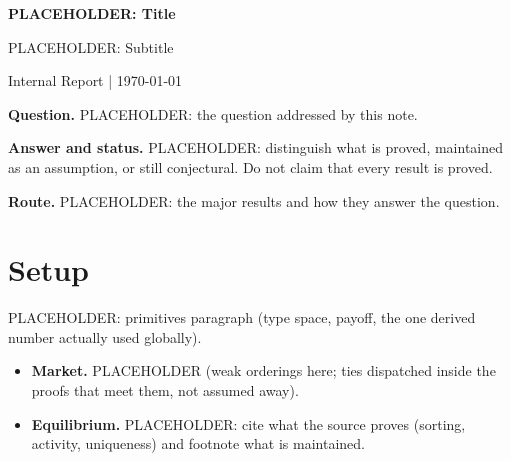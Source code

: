 \documentclass[12pt]{article}
\theoremstyle{remark}
\begin{document}
\begin{center}
{\Large \textbf{PLACEHOLDER: Title}}

{\large PLACEHOLDER: Subtitle}

\medskip

Internal Report \hspace{1em}|\hspace{1em} \today
\end{center}

\textbf{Question.} PLACEHOLDER: the question addressed by this note.

\textbf{Answer and status.} PLACEHOLDER: distinguish what is proved, maintained
as an assumption, or still conjectural. Do not claim that every result is proved.

\textbf{Route.} PLACEHOLDER: the major results and how they answer the question.

\section{Setup}


PLACEHOLDER: primitives paragraph (type space, payoff, the one derived number
actually used globally).

\begin{itemize}
  \item \textbf{Market.} PLACEHOLDER (weak orderings here; ties dispatched
    inside the proofs that meet them, not assumed away).
  \item \textbf{Equilibrium.} PLACEHOLDER: cite what the source proves
    (sorting, activity, uniqueness) and footnote what is maintained.
\end{itemize}


\clearpage
\end{document}
